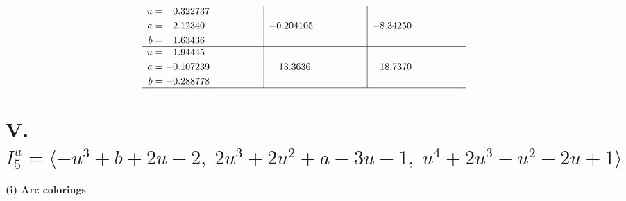 \documentclass[1p]{elsarticle_modified}
\theoremstyle{definition}
\begin{document}
$$\begin{array}{c|c|c}
\begin{aligned}
u &= \phantom{-}0.322737\phantom{ +0.000000I} \\
a &= -2.12340\phantom{ +0.000000I} \\
b &= \phantom{-}1.63436\phantom{ +0.000000I}\end{aligned}
 & -0.204105\phantom{ +0.000000I} & -8.34250\phantom{ +0.000000I} \\ \hline\begin{aligned}
u &= \phantom{-}1.94445\phantom{ +0.000000I} \\
a &= -0.107239\phantom{ +0.000000I} \\
b &= -0.288778\phantom{ +0.000000I}\end{aligned}
 & \phantom{-}13.3636\phantom{ +0.000000I} & \phantom{-}18.7370\phantom{ +0.000000I}\\
 \hline 
 \end{array}$$\newpage\newpage\renewcommand{\arraystretch}{1}
\centering \section*{V. $I^u_{5}= \langle - u^3+b+2 u-2,\;2 u^3+2 u^2+a-3 u-1,\;u^4+2 u^3- u^2-2 u+1 \rangle$}
\flushleft \textbf{(i) Arc colorings}\\
\end{document}
